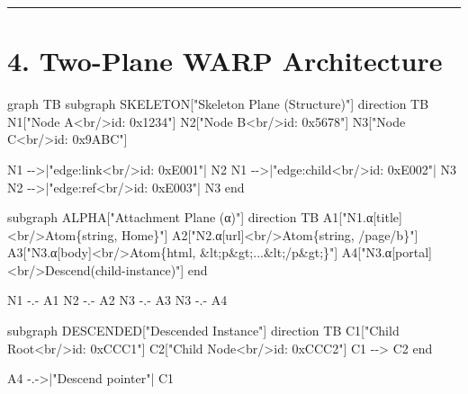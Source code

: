\documentclass[
]{book}
\newenvironment{Shaded}{}{}
\newcommand{\NormalTok}[1]{#1}
\begin{document}
\begin{center}\rule{0.5\linewidth}{0.5pt}\end{center}

\section{4. Two-Plane WARP
Architecture}\label{two-plane-warp-architecture}

\begin{Shaded}
\begin{Highlighting}[]
\NormalTok{graph TB}
\NormalTok{    subgraph SKELETON["Skeleton Plane (Structure)"]}
\NormalTok{        direction TB}
\NormalTok{        N1["Node A\textless{}br/\textgreater{}id: 0x1234"]}
\NormalTok{        N2["Node B\textless{}br/\textgreater{}id: 0x5678"]}
\NormalTok{        N3["Node C\textless{}br/\textgreater{}id: 0x9ABC"]}

\NormalTok{        N1 {-}{-}\textgreater{}|"edge:link\textless{}br/\textgreater{}id: 0xE001"| N2}
\NormalTok{        N1 {-}{-}\textgreater{}|"edge:child\textless{}br/\textgreater{}id: 0xE002"| N3}
\NormalTok{        N2 {-}{-}\textgreater{}|"edge:ref\textless{}br/\textgreater{}id: 0xE003"| N3}
\NormalTok{    end}

\NormalTok{    subgraph ALPHA["Attachment Plane (α)"]}
\NormalTok{        direction TB}
\NormalTok{        A1["N1.α[\textquotesingle{}title\textquotesingle{}]\textless{}br/\textgreater{}Atom\{string, \textquotesingle{}Home\textquotesingle{}\}"]}
\NormalTok{        A2["N2.α[\textquotesingle{}url\textquotesingle{}]\textless{}br/\textgreater{}Atom\{string, \textquotesingle{}/page/b\textquotesingle{}\}"]}
\NormalTok{        A3["N3.α[\textquotesingle{}body\textquotesingle{}]\textless{}br/\textgreater{}Atom\{html, \textquotesingle{}\&lt;p\&gt;...\&lt;/p\&gt;\textquotesingle{}\}"]}
\NormalTok{        A4["N3.α[\textquotesingle{}portal\textquotesingle{}]\textless{}br/\textgreater{}Descend(\textquotesingle{}child{-}instance\textquotesingle{})"]}
\NormalTok{    end}

\NormalTok{    N1 {-}.{-} A1}
\NormalTok{    N2 {-}.{-} A2}
\NormalTok{    N3 {-}.{-} A3}
\NormalTok{    N3 {-}.{-} A4}

\NormalTok{    subgraph DESCENDED["Descended Instance"]}
\NormalTok{        direction TB}
\NormalTok{        C1["Child Root\textless{}br/\textgreater{}id: 0xCCC1"]}
\NormalTok{        C2["Child Node\textless{}br/\textgreater{}id: 0xCCC2"]}
\NormalTok{        C1 {-}{-}\textgreater{} C2}
\NormalTok{    end}

\NormalTok{    A4 {-}.{-}\textgreater{}|"Descend pointer"| C1}
\end{Highlighting}
\end{Shaded}
\end{document}
